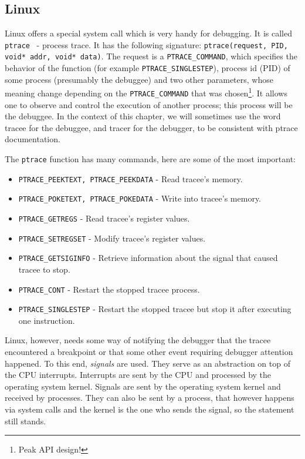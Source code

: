 \subsection{Linux}\label{section:linux-dbg}
Linux offers a special system call which is very handy for debugging. It is
called \texttt{ptrace}~\cite{ptrace} - process trace. It has the following
signature: \texttt{ptrace(request, PID, void* addr, void* data)}. The request
is a \texttt{PTRACE\_COMMAND}, which specifies the behavior of the function
(for example \texttt{PTRACE\_SINGLESTEP}), process id (PID) of some process
(presumably the debuggee) and two other parameters, whose meaning change
depending on the \texttt{PTRACE\_COMMAND} that was chosen\footnote{Peak API
design!}. It allows one to observe and control the execution of another
process; this process will be the debuggee. In the context of this chapter, we
will sometimes use the word tracee for the debuggee, and tracer for the
debugger, to be consistent with ptrace documentation.

The \texttt{ptrace} function has many commands, here are some of the most important:
\begin{itemize}
    \item \texttt{PTRACE\_PEEKTEXT, PTRACE\_PEEKDATA} - Read tracee's memory.
    \item \texttt{PTRACE\_POKETEXT, PTRACE\_POKEDATA} - Write into tracee's
          memory.
    \item \texttt{PTRACE\_GETREGS} - Read tracee's register values.
    \item \texttt{PTRACE\_SETREGSET} - Modify tracee's register values.
    \item \texttt{PTRACE\_GETSIGINFO} - Retrieve information about the signal
                                        that caused tracee to stop.
    \item \texttt{PTRACE\_CONT} - Restart the stopped tracee process.
    \item \texttt{PTRACE\_SINGLESTEP} - Restart the stopped tracee but
          stop it after executing one instruction.
\end{itemize}

Linux, however, needs some way of notifying the debugger that the tracee
encountered a breakpoint or that some other event requiring debugger attention
happened. To this end, \textit{signals} are used. They serve as an abstraction
on top of the CPU interrupts. Interrupts are sent by the CPU and processed by
the operating system kernel. Signals are sent by the operating system kernel
and received by processes. They can also be sent by a process, that however
happens via system calls and the kernel is the one who sends the signal, so the
statement still stands.

